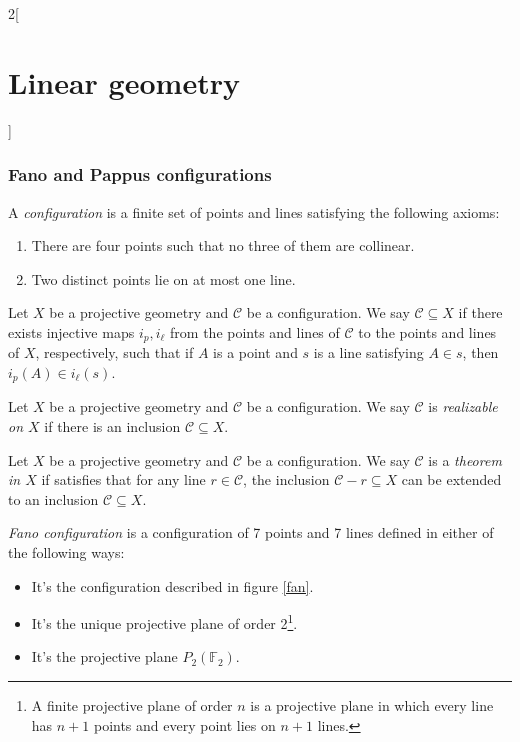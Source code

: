 \documentclass[../../../main.tex]{subfiles}
\begin{document}
\begin{multicols}{2}[\section{Linear geometry}]
\subsubsection*{Fano and Pappus configurations}
\begin{definition}
A \textit{configuration} is a finite set of points and lines satisfying the following axioms:
\begin{enumerate}
    \item There are four points such that no three of them are collinear.
    \item Two distinct points lie on at most one line.
\end{enumerate}
\end{definition}
\begin{definition}
Let $X$ be a projective geometry and $\mathcal{C}$ be a configuration. We say $\mathcal{C}\subseteq X$ if there exists injective maps $i_p,i_\ell$ from the points and lines of $\mathcal{C}$ to the points and lines of $X$, respectively, such that if $A$ is a point and $s$ is a line satisfying $A\in s$, then $i_p(A)\in i_\ell(s)$.
\end{definition}
\begin{definition}
Let $X$ be a projective geometry and $\mathcal{C}$ be a configuration. We say $\mathcal{C}$ is \textit{realizable on $X$} if there is an inclusion $\mathcal{C}\subseteq X$.
\end{definition}
\begin{definition}
Let $X$ be a projective geometry and $\mathcal{C}$ be a configuration. We say $\mathcal{C}$ is a \textit{theorem in $X$} if satisfies that for any line $r\in\mathcal{C}$, the inclusion $\mathcal{C}-r\subseteq X$ can be extended to an inclusion $\mathcal{C}\subseteq X$.
\end{definition}
\begin{definition}
\textit{Fano configuration} is a configuration of 7 points and 7 lines defined in either of the following ways:
\begin{itemize}
    \item It's the configuration described in figure \ref{fan}.
    \item It's the unique projective plane of order 2\footnote{A finite projective plane of order $n$ is a  projective plane in which every line has $n+1$ points and every point lies on $n+1$ lines.}.
    \item It's the projective plane $P_2(\mathbb{F}_2)$.
\end{itemize}

\end{definition}
\end{multicols}
\end{document}
